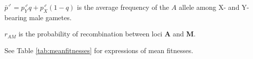 \documentclass[12pt]{article}
\begin{document}
\begin{threeparttable}[ht]
\begin{tabular}{l}
  \hline \hline 
   \end{tabular}
      \begin{tablenotes}
      \scriptsize
      \item $\bar{p}^{\male}=p_{Y}^{\male}q+p_{X}^{\male}(1-q)$ is the average frequency of the $A$ allele among X- and Y-bearing male gametes.
      \item $r_{AM}$ is the probability of recombination between loci \textbf{A} and \textbf{M}.
      \item See Table \ref{tab:meanfitnesses} for expressions of mean fitnesses.
    \end{tablenotes}
  \label{tab:haplotype_growth}
\end{threeparttable}
\\
\end{document}
